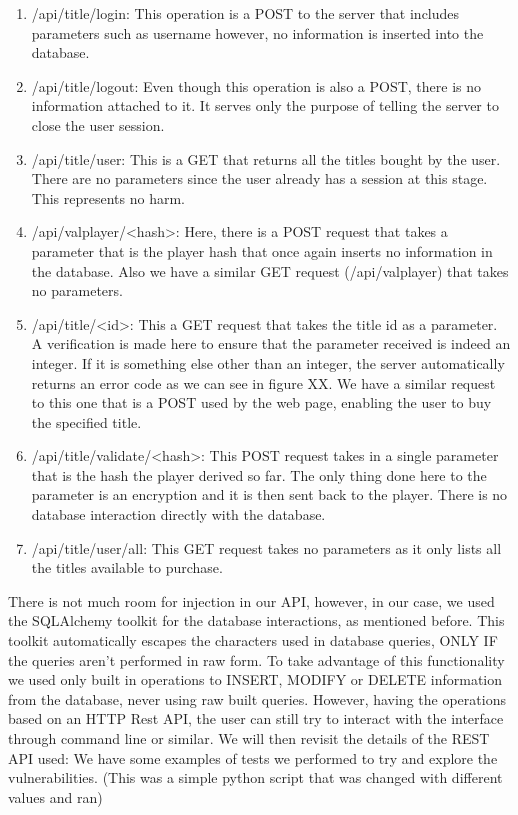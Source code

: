 \documentclass[11pt,a4paper]{report}
\begin{document}
\begin{enumerate}
 \item /api/title/login: This operation is a POST to the server that includes parameters such as username however, no information is inserted into the database.
 \item /api/title/logout: Even though this operation is also a POST, there is no information attached to it. It serves only the purpose of telling the server to close the user session.
 \item /api/title/user: This is a GET that returns all the titles bought by the user. There are no parameters since the user already has a session at this stage. This represents no harm.
 \item /api/valplayer/<hash>: Here, there is a POST request that takes a parameter that is the player hash that once again inserts no information in the database. Also we have a similar GET request (/api/valplayer) that takes no parameters.
 \item /api/title/<id>: This a GET request that takes the title id as a parameter. A verification is made here to ensure that the parameter received is indeed an integer. If it is something else other than an integer, the server automatically returns an error code as we can see in figure XX. We have a similar request to this one that is a POST used by the web page, enabling the user to buy the specified title.
 \item /api/title/validate/<hash>: This POST request takes in a single parameter that is the hash the player derived so far. The only thing done here to the parameter is an encryption and it is then sent back to the player. There is no database interaction directly with the database.
 \item /api/title/user/all: This GET request takes no parameters as it only lists all the titles available to purchase.
\end{enumerate}

There is not much room for injection in our API, however, in our case, we used the SQLAlchemy toolkit for the database interactions, as mentioned before. This toolkit automatically escapes the characters used in database queries, ONLY IF the queries aren't performed in raw form. To take advantage of this functionality we used only built in operations to INSERT, MODIFY or DELETE information from the database, never using raw built queries.
\newline
However, having the operations based on an HTTP Rest API, the user can still try to interact with the interface through command line or similar. We will then revisit the details of the REST API used:
We have some examples of tests we performed to try and explore the vulnerabilities. (This was a simple python script that was changed with different values and ran)
\end{document}
